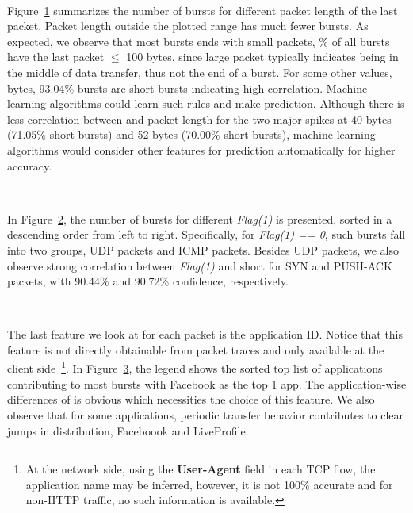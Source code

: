 \begin{figure}[t]
\centering
{} \\
\label{fig:len1}
\end{figure}

Figure~\ref{fig:len1} summarizes the number of bursts for different packet length of the last packet. Packet length outside the plotted range has much fewer bursts. As expected, we observe that most bursts ends with small packets, \% of all bursts have the last packet $\leq$ 100 bytes, since large packet typically indicates being in the middle of data transfer, thus not the end of a burst. For some other values,  bytes, 93.04\% bursts are short bursts indicating high correlation. Machine learning algorithms could learn such rules and make prediction. Although there is less correlation between \IBT and packet length for the two major spikes at 40 bytes (71.05\% short bursts) and 52 bytes (70.00\% short bursts), machine learning algorithms would consider other features for prediction automatically for higher accuracy.

\begin{figure}[t]
\centering
{} \\
\label{fig:flag1.bar}
\end{figure}

In Figure~\ref{fig:flag1.bar}, the number of bursts for different {\em Flag(1)} is presented, sorted in a descending order from left to right. Specifically, for {\em Flag(1) == 0}, such bursts fall into two groups, UDP packets and ICMP packets. Besides UDP packets, we also observe strong correlation between {\em Flag(1)} and short \IBTS for SYN and PUSH-ACK packets, with 90.44\% and 90.72\% confidence, respectively.


\begin{figure}[t]
\centering
{} \\
\label{fig:appid1}
\end{figure}
The last feature we look at for each packet is the application ID. Notice that this feature is not directly obtainable from packet traces and only available at the client side~\footnote{At the network side, using the \textbf{User-Agent} field in each TCP flow, the application name may be inferred, however, it is not 100\% accurate and for non-HTTP traffic, no such information is available.}. In Figure~\ref{fig:appid1}, the legend shows the sorted top list of applications contributing to most bursts with Facebook as the top 1 app. The application-wise differences of \IBT is obvious which necessities the choice of this feature. We also observe that for some applications, periodic transfer behavior contributes to clear jumps in \IBT distribution, \eg Faceboook and LiveProfile.




